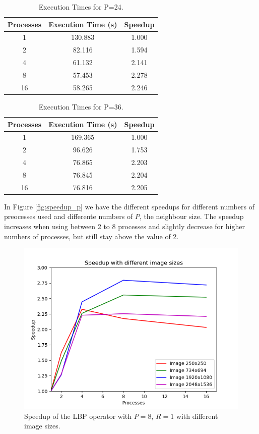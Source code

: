 \documentclass[10pt,twocolumn,letterpaper]{article}
\begin{document}
\begin{table}[H]
	\begin{center}
		\begin{tabular}{|c|c|c|}
			\hline
			Processes & Execution Time (s) & Speedup \\
			\hline
			1 & 130.883 & 1.000 \\
			2 & 82.116 & 1.594 \\
			4 & 61.132 & 2.141 \\
			8 & 57.453 & 2.278 \\
			16 & 58.265 & 2.246 \\
			\hline
		\end{tabular}
	\end{center}
	\caption{Execution Times for P=24.}
	\label{tab:speedup_k_3}
\end{table}

\begin{table}[H]
	\begin{center}
		\begin{tabular}{|c|c|c|}
			\hline
			Processes & Execution Time (s) & Speedup \\
			\hline
			1 & 169.365 & 1.000 \\
			2 & 96.626 & 1.753 \\
			4 & 76.865 & 2.203 \\
			8 & 76.845 & 2.204 \\
			16 & 76.816 & 2.205 \\
			\hline
		\end{tabular}
	\end{center}
	\caption{Execution Times for P=36.}
	\label{tab:speedup_k_4}
\end{table}

In Figure \ref{fig:speedup_p} we have the different speedups for different numbers of preocesses used and differente numbers of $P$, the neighbour size. The speedup increases when using between 2 to 8 processes and slightly decrease for higher numbers of processes, but still stay above the value of 2.

\begin{figure}[H]
	\includegraphics[width=\linewidth]{images/speedup_by_img_sizes.png}
	\caption{Speedup of the LBP operator with $P=8$, $R=1$ with different image sizes.}
	\label{fig:speedup_img}
\end{figure}
\end{document}

